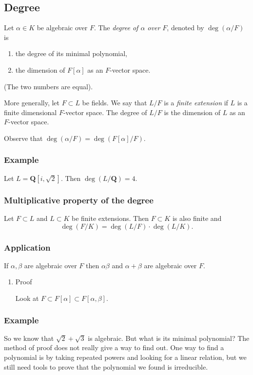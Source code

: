 \documentclass[11pt]{article}
\begin{document}
\subsection{Degree}
\label{sec:org19e505e}
Let \(\alpha \in K\) be algebraic over \(F\).
The \emph{degree of \(\alpha\) over \(F\)}, denoted by \(\deg(\alpha/F)\) is
\begin{enumerate}
\item the degree of its minimal polynomial,
\item the dimension of \(F[\alpha]\) as an \(F\)-vector space.
\end{enumerate}
(The two numbers are equal).

More generally, let \(F \subset L\) be fields.
We say that \(L/F\) is a \emph{finite extension} if \(L\) is a finite dimensional \(F\)-vector space.
The degree of \(L/F\) is the dimension of \(L\) as an \(F\)-vector space.

Observe that \(\deg(\alpha/F) = \deg(F[\alpha]/F)\).
\subsubsection{Example}
\label{sec:org24de37e}
Let \(L = \mathbf{Q}[i, \sqrt 2]\).
Then \(\deg (L / \mathbf{Q}) = 4\).
\subsubsection{Multiplicative property of the degree}
\label{sec:org77f198f}
Let \(F \subset L\) and \(L \subset K\) be finite extensions.
Then \(F \subset K\) is also finite and
\[ \deg(F/K) = \deg(L/F) \cdot \deg (L/K).\]
\subsubsection{Application}
\label{sec:org16acc2d}
If \(\alpha, \beta\) are algebraic over \(F\) then \(\alpha\beta\) and \(\alpha+\beta\) are algebraic over \(F\).
\begin{enumerate}
\item Proof
\label{sec:orgaeaadd8}

Look at \(F \subset F[\alpha] \subset F[\alpha,\beta]\).
\end{enumerate}
\subsubsection{Example}
\label{sec:org4b66f03}
So we know that \(\sqrt 2 + \sqrt 3\) is algebraic.
But what is its minimal polynomial?
The method of proof does not really give a way to find out.
One way to find a polynomial is by taking repeated powers and looking for a linear relation, but we still need tools to prove that the polynomial we found is irreducible.
\end{document}
